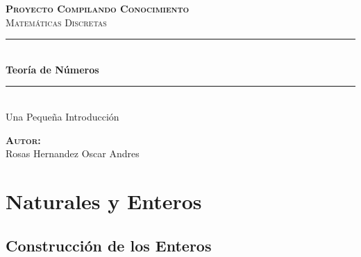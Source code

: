 \documentclass[12pt, fleqn]{report}                             %
\author{Oscar Andrés Rosas}                                     %
\begin{document}
\begin{titlepage}

	\center
	\textbf{\textsc{\Large Proyecto Compilando Conocimiento}}\\[1.0cm] 
	\textsc{\Large Matemáticas Discretas}\\[1.0cm] 

	\rule{\linewidth}{0.5mm} \\[1.0cm]
		{ \huge \bfseries Teoría de Números}\\[1.0cm] 
	\rule{\linewidth}{0.5mm} \\[2.0cm]
	
	{\LARGE Una Pequeña Introducción}\\[7cm] 
	
	\begin{center} \large
	\textbf{\textsc{Autor:}}\\
	Rosas Hernandez Oscar Andres
	\end{center}

	\vfill

\end{titlepage}

\tableofcontents{}
\label{sec:Index}

\clearpage










\chapter{Naturales y Enteros}
    \clearpage


    \section{Construcción de los Enteros}
\end{document}
